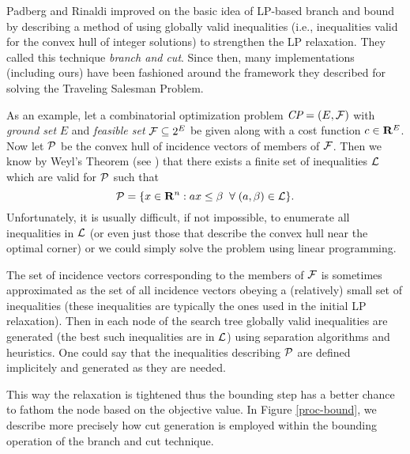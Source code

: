 Padberg and Rinaldi \cite{A:padberg-rinaldi} improved on the basic idea of 
LP-based branch and 
bound by describing a method
of using globally valid inequalities (i.e., inequalities valid for the
convex hull of integer solutions) to strengthen the LP relaxation.
They called this technique {\em branch and cut}. Since then, many
implementations (including ours) have been fashioned around the
framework they described for solving the Traveling Salesman Problem.

As an example, let a combinatorial optimization problem $\hbox{\em CP} =
(E, {\cal F})$ with {\em ground set} $E$ and {\em feasible set} ${\cal F}
\subseteq 2^E$ be given along with a cost function $c \in {\bf R}^E$.
Now let ${\cal P}$ be the convex hull of incidence vectors of members of 
${\cal F}$. Then we know by Weyl's Theorem (see \cite{B:nemhauser-wolsey}) 
that there 
exists a finite set of inequalities ${\cal L}$ which are valid for 
${\cal P}$ such that
\begin{equation}
\label{the-polyhedron}
{\cal P} = \{x \in {\bf R}^n: ax \leq \beta\;\;\forall\;(a, \beta) \in 
{\cal L}\}.
\end{equation}
Unfortunately, it is usually
difficult, if not impossible, to enumerate all inequalities in
${\cal L}$ (or even just those that describe the convex hull near the 
optimal corner) or we could simply solve the problem using linear
programming.

The set of incidence vectors corresponding to the members of ${\cal F}$ is
sometimes approximated as the set of all incidence vectors obeying a
(relatively) small set of inequalities (these inequalities are
typically the ones used in the initial LP relaxation). Then in each node of
the search tree globally valid inequalities are generated (the best such
inequalities are in ${\cal L}$) using separation algorithms and heuristics.
One could say that the inequalities describing ${\cal P}$ are defined
implicitely and generated as they are needed.

This way the relaxation is tightened thus the bounding step has a better
chance to fathom the node based on the objective value.
In Figure \ref{proc-bound}, we describe more
precisely how cut generation is employed within the bounding operation 
of the branch and cut technique.

